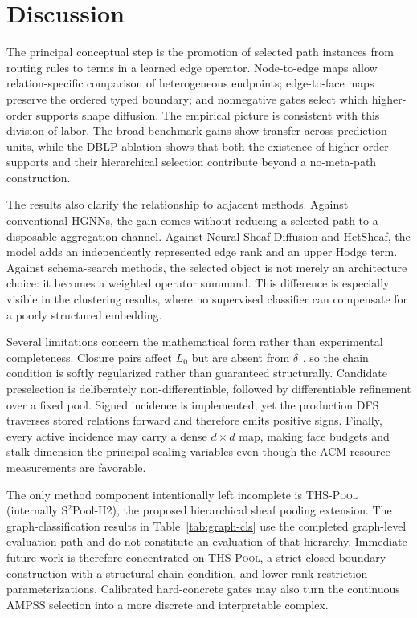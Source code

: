 \documentclass{article}
\newcommand{\ampss}{\textsc{AMPSS}}
\newcommand{\thspool}{\textsc{THS-Pool}}
\begin{document}
\section{Discussion}
\label{sec:discussion}

The principal conceptual step is the promotion of selected path instances from routing rules to
terms in a learned edge operator. Node-to-edge maps allow relation-specific comparison of
heterogeneous endpoints; edge-to-face maps preserve the ordered typed boundary; and nonnegative
gates select which higher-order supports shape diffusion. The empirical picture is consistent with
this division of labor. The broad benchmark gains show transfer across prediction units, while the
DBLP ablation shows that both the existence of higher-order supports and their hierarchical
selection contribute beyond a no-meta-path construction.

The results also clarify the relationship to adjacent methods. Against conventional HGNNs, the
gain comes without reducing a selected path to a disposable aggregation channel. Against Neural
Sheaf Diffusion and HetSheaf, the model adds an independently represented edge rank and an upper
Hodge term. Against schema-search methods, the selected object is not merely an architecture choice:
it becomes a weighted operator summand. This difference is especially visible in the clustering
results, where no supervised classifier can compensate for a poorly structured embedding.

Several limitations concern the mathematical form rather than experimental completeness. Closure
pairs affect $L_0$ but are absent from $\delta_1$, so the chain condition is softly regularized rather
than guaranteed structurally. Candidate preselection is deliberately non-differentiable, followed
by differentiable refinement over a fixed pool. Signed incidence is implemented, yet the production
DFS traverses stored relations forward and therefore emits positive signs. Finally, every active
incidence may carry a dense $d\times d$ map, making face budgets and stalk dimension the principal
scaling variables even though the ACM resource measurements are favorable.

The only method component intentionally left incomplete is \thspool{} (internally S$^2$Pool-H2),
the proposed hierarchical sheaf pooling extension. The graph-classification results in
Table~\ref{tab:graph-cls} use the completed graph-level evaluation path and do not constitute an
evaluation of that hierarchy. Immediate future work is therefore concentrated on \thspool{}, a
strict closed-boundary construction with a structural chain condition, and lower-rank restriction
parameterizations. Calibrated hard-concrete gates may also turn the continuous \ampss{} selection
into a more discrete and interpretable complex.
\end{document}
